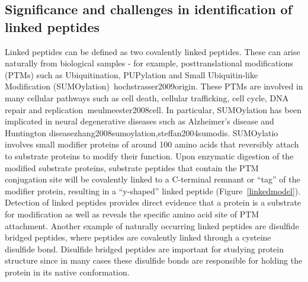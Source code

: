 \subsection{Significance and challenges in identification of linked peptides}
Linked peptides can be defined as two 
covalently linked peptides. These can arise naturally from biological samples \-- for example, posttranslational modifications (PTMs) such as Ubiquitination, PUPylation and Small Ubiquitin-like Modification (SUMOylation)~\cite{unv}{hochstrasser2009origin}. These PTMs are involved in many cellular pathways such as cell death, cellular trafficking, cell cycle, DNA repair and replication~\cite{unv}{meulmeester2008cell}. In particular, SUMOylation has been implicated in neural degenerative diseases such as Alzheimer's disease  and Huntington disease\cite{unv}{zhang2008sumoylation,steffan2004sumodis}. 
 SUMOylatio involves small modifier proteins of around 100 amino acids that reversibly attach to substrate proteins to modify their function.
Upon enzymatic digestion of the modified substrate proteins, substrate peptides that contain the PTM conjugation site will be covalently linked to a C-terminal remnant or ``tag'' of the modifier protein, resulting in a ``y-shaped'' linked peptide (Figure~\ref{linkedmodel}). Detection of linked peptides provides direct evidence that a protein is a substrate for modification as well as reveals the specific amino acid site of PTM attachment. Another example of naturally occurring linked peptides are disulfide bridged peptides, where peptides are covalently linked through a cysteine disulfide bond.  Disulfide bridged peptides are important for studying protein structure since in many cases these disulfide bonds are responsible for holding the protein in its native conformation.

